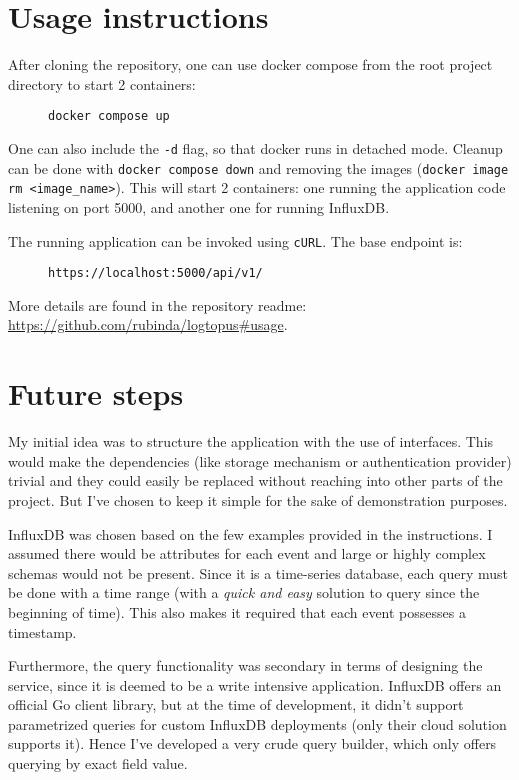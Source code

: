 \documentclass[twocolumn]{article}
\begin{document}
\section{Usage instructions} 
After cloning the repository, one can use docker compose from the root project directory to start 2 containers:
\begin{figure}[h]
\centering
\begin{BVerbatim}
docker compose up
\end{BVerbatim}
\end{figure}

One can also include the \texttt{-d} flag, so that docker runs in detached mode. Cleanup can be done with \texttt{docker compose down} and removing the images (\texttt{docker image rm <image\_name>}). This will start 2 containers: one running the application code listening on port 5000, and another one for running InfluxDB.

The running application can be invoked using \texttt{cURL}. The base endpoint is:
\begin{figure}[h]
\centering
\begin{BVerbatim}
https://localhost:5000/api/v1/
\end{BVerbatim}
\end{figure}

More details are found in the repository readme: \url{https://github.com/rubinda/logtopus#usage}.

\section{Future steps}

My initial idea was to structure the application with the use of interfaces. This would make the dependencies (like storage mechanism or authentication provider) trivial and they could easily be replaced without reaching into other parts of the project. But I've chosen to keep it simple for the sake of demonstration purposes.

InfluxDB was chosen based on the few examples provided in the instructions. I assumed there would be attributes for each event and large or highly complex schemas would not be present. Since it is a time-series database, each query must be done with a time range (with a \textit{quick and easy} solution to query since the beginning of time). This also makes it required that each event possesses a timestamp. 

Furthermore, the query functionality was secondary in terms of designing the service, since it is deemed to be a write intensive application. InfluxDB offers an official Go client library, but at the time of development, it didn't support parametrized queries for custom InfluxDB deployments (only their cloud solution supports it). Hence I've developed a very crude query builder, which only offers querying by exact field value. 
\end{document}
